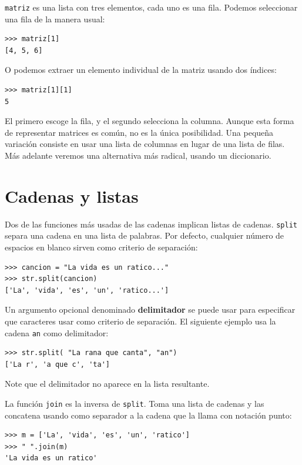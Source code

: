 \texttt{matriz} es una lista con tres elementos, cada uno es una fila.
Podemos seleccionar una fila de la manera usual:
\begin{verbatim}
>>> matriz[1]
[4, 5, 6]
\end{verbatim}

O podemos extraer un elemento individual de la matriz usando dos índices:
\begin{verbatim}
>>> matriz[1][1]
5
\end{verbatim}

El primero escoge la fila, y el segundo selecciona la columna. Aunque
esta forma de representar matrices es común, no es la única posibilidad.
Una pequeña variación consiste en usar una lista de columnas en lugar
de una lista de filas. Más adelante veremos una alternativa más radical,
usando un diccionario.

  

\section{Cadenas y listas}

 

Dos de las funciones más usadas de las cadenas implican listas de
cadenas. \texttt{split} separa una cadena en una lista de palabras.
Por defecto, cualquier número de espacios en blanco sirven como criterio
de separación:
\begin{verbatim}
>>> cancion = "La vida es un ratico..."
>>> str.split(cancion)
['La', 'vida', 'es', 'un', 'ratico...']
\end{verbatim}
Un argumento opcional denominado \textbf{delimitador} se puede usar
para especificar que caracteres usar como criterio de separación.
El siguiente ejemplo usa la cadena \texttt{an} como delimitador:
\begin{verbatim}
>>> str.split( "La rana que canta", "an")
['La r', 'a que c', 'ta']
\end{verbatim}

Note que el delimitador no aparece en la lista resultante.

La función \texttt{join} es la inversa de \texttt{split}. Toma una
lista de cadenas y las concatena usando como separador a la cadena
que la llama con notación punto:
\begin{verbatim}
>>> m = ['La', 'vida', 'es', 'un', 'ratico']
>>> " ".join(m)
'La vida es un ratico'
\end{verbatim}

